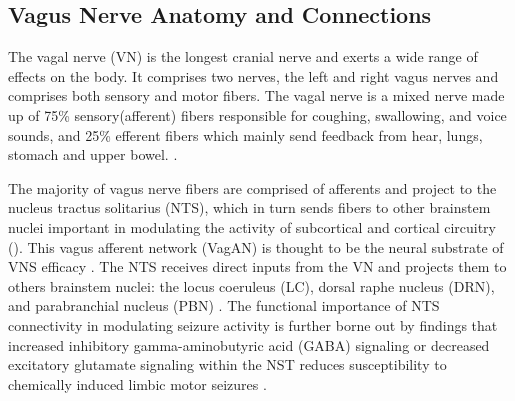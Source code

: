   \subsection*{Vagus Nerve Anatomy and Connections}
  The vagal nerve (VN) is the longest cranial nerve and exerts a wide range of effects on the body. It comprises two nerves, the left and right vagus nerves and comprises both sensory and motor fibers.
  The vagal nerve is a mixed nerve made up of 75\% sensory(afferent) fibers responsible for coughing, swallowing, and voice sounds, and 25\% efferent fibers which mainly send feedback from hear, lungs, stomach and upper bowel.  \cite{BonazSinniger2017}.

  The majority of vagus nerve fibers are comprised of afferents and project to the nucleus tractus solitarius (NTS), which in turn sends fibers to other brainstem nuclei important in modulating the activity of subcortical and cortical circuitry (). This vagus afferent network (VagAN) is
  thought to be the neural substrate of VNS efficacy \cite{HanchemWongIbrahim2018}. 
  The NTS receives direct inputs from the VN and projects them to others brainstem nuclei: the locus coeruleus (LC), dorsal raphe nucleus (DRN), and parabranchial nucleus (PBN) \cite{RICARDO19781}. The functional importance of NTS connectivity in modulating seizure activity is further borne out by findings that increased inhibitory gamma-aminobutyric acid (GABA) signaling or decreased excitatory glutamate signaling within the NST reduces susceptibility to chemically induced limbic motor seizures \cite{GABA}.

